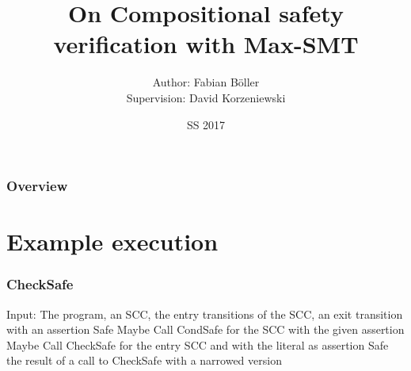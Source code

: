 \documentclass{beamer}
\title[Compositional safety verification]{On Compositional safety verification with Max-SMT} %
\author{Author: Fabian B\"{o}ller \\ Supervision: David Korzeniewski} %
\institute[i2] %
{
RWTH Aachen \\ %
\medskip
\textit{fabian.boeller@rwth-aachen.de} %
}
\date{SS 2017} %
\let\oldReturn\Return
\renewcommand{\Return}{\State\oldReturn}
\begin{document}
\begin{frame}
\titlepage %
\end{frame}

\begin{frame}
\frametitle{Overview} %
\tableofcontents %
\end{frame}


\section{Example execution}

\begin{frame}
  \frametitle{CheckSafe}
    \begin{algorithmic}[1]
      \State Input: The program, an SCC, the entry transitions of the SCC, an exit transition with an assertion
      \pause
      \Return Safe
      \pause
      \Return Maybe
      \EndIf
      \pause
      \State Call CondSafe for the SCC with the given assertion
      \pause
      \Return Maybe
      \EndIf
      \pause
      \State Call CheckSafe for the entry SCC and with the literal as assertion
      \EndFor
      \EndFor
      \pause
      \Return Safe
      \EndIf
      \pause
      \Return the result of a call to CheckSafe with a narrowed version
    \end{algorithmic}
\end{frame}
\end{document}

